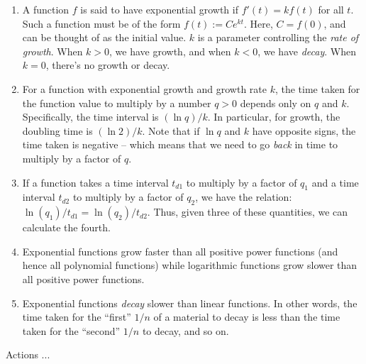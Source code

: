 \documentclass{amsart}
\begin{document}
\begin{enumerate}
\item A function $f$ is said to have exponential growth if $f'(t) =
  kf(t)$ for all $t$. Such a function must be of the form $f(t) :=
  Ce^{kt}$. Here, $C = f(0)$, and can be thought of as the initial
  value. $k$ is a parameter controlling the {\em rate of growth}. When
  $k > 0$, we have growth, and when $k < 0$, we have {\em decay}. When
  $k = 0$, there's no growth or decay.
\item For a function with exponential growth and growth rate $k$, the
  time taken for the function value to multiply by a number $q > 0$
  depends only on $q$ and $k$. Specifically, the time interval is
  $(\ln q)/k$. In particular, for growth, the doubling time is $(\ln
  2)/k$. Note that if $\ln q$ and $k$ have opposite signs, the time
  taken is negative -- which means that we need to go {\em back} in
  time to multiply by a factor of $q$.
\item If a function takes a time interval $t_{d1}$ to multiply by a
  factor of $q_1$ and a time interval $t_{d2}$ to multiply by a factor
  of $q_2$, we have the relation: $\ln(q_1)/t_{d1} =
  \ln(q_2)/t_{d2}$. Thus, given three of these quantities, we can
  calculate the fourth.
\item Exponential functions grow faster than all positive power
  functions (and hence all polynomial functions) while logarithmic
  functions grow slower than all positive power functions.
\item Exponential functions {\em decay} slower than linear
  functions. In other words, the time taken for the ``first'' $1/n$ of
  a material to decay is less than the time taken for the ``second''
  $1/n$ to decay, and so on.
\end{enumerate}

Actions ...
\end{document}

